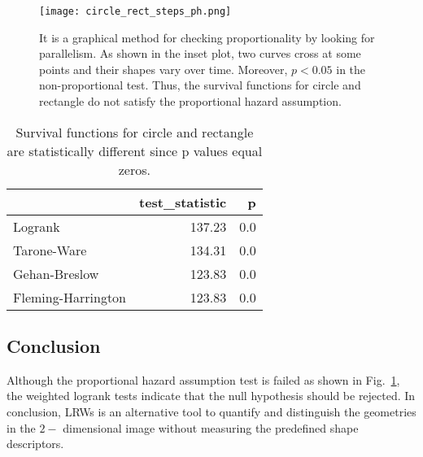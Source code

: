    \begin{figure}
     \centering
     \texttt{[image: circle\_rect\_steps\_ph.png]}
     \label{fig:ph_test_simple_shapes}
     \caption{It is a graphical method for checking proportionality by looking for parallelism. As shown in the inset plot, two curves cross at some points and their shapes vary over time. Moreover, $p < 0.05$ in the non-proportional test. Thus, the survival functions for circle and rectangle do not satisfy the proportional hazard assumption.}
   \end{figure}


   \begin{table}
     \centering
     \begin{tabular}{lrr}
        \toprule
         {} &  test\_statistic &             p \\
         \midrule
         Logrank & 137.23 & 0.0 \\
         \midrule
         Tarone-Ware & 134.31 & 0.0 \\
         \midrule
         Gehan-Breslow & 123.83 & 0.0 \\
         \midrule
         Fleming-Harrington & 123.83 & 0.0 \\
         \bottomrule
     \end{tabular}
     \caption{Survival functions for circle and rectangle are statistically different since p values equal zeros.}
     \label{tab:test_simple_shape_steps}
   \end{table}



\subsection{Conclusion}


Although the proportional hazard assumption test is failed as shown in
Fig.~\ref{fig:ph_test_simple_shapes}, the weighted logrank tests
indicate that the null hypothesis should be rejected. In conclusion,
LRWs is an alternative tool to quantify and distinguish the geometries
in the $2-$ dimensional image without measuring the predefined shape
descriptors.
  
